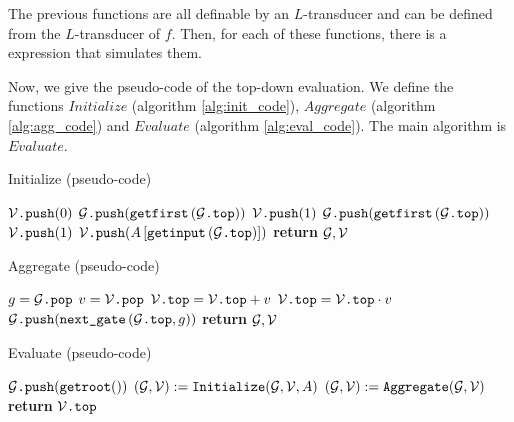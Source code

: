 The previous functions are all definable by an $L$-transducer and can be defined from the $L$-transducer of $f$. Then, for each of these functions, there is a \langfor expression that simulates them.

Now, we give the pseudo-code of the top-down evaluation. We define the functions $Initialize$ (algorithm \ref{alg:init_code}), $Aggregate$ (algorithm \ref{alg:agg_code}) and $Evaluate$ (algorithm \ref{alg:eval_code}). The main algorithm is $Evaluate$.

\begin{algorithm}
\caption{Initialize (pseudo-code)}\label{alg:init_code}
\begin{algorithmic}[1]
	\If{$\isplus{\gettop{\cG}}$}
		\State $\mathcal{V}\texttt{.push}(0)$
		\State $\mathcal{G}\texttt{.push}(\texttt{getfirst}\left(\mathcal{G}\texttt{.top} \right))$
	\ElsIf{$\isprod{\gettop{\cG}}$}
		\State $\mathcal{V}\texttt{.push}(1)$
		\State $\mathcal{G}\texttt{.push}(\texttt{getfirst}\left(\mathcal{G}\texttt{.top} \right))$
	\ElsIf{$\isone{\gettop{\cG}}$}
		\State $\mathcal{V}\texttt{.push}(1)$
	\ElsIf{$\isinput{\gettop{\cG}}$}
		\State $\mathcal{V}\texttt{.push}(A\left[ \texttt{getinput}\left(\mathcal{G}\texttt{.top} \right) \right])$
	\EndIf
	\State \textbf{return} $\mathcal{G}, \mathcal{V}$
\EndFunction
\end{algorithmic}
\end{algorithm}

\begin{algorithm}
\caption{Aggregate (pseudo-code)}\label{alg:agg_code}
\begin{algorithmic}[1]
	\State $g = \mathcal{G}\texttt{.pop}$
	\State $v = \mathcal{V}\texttt{.pop}$
	\If{$\isplus{\gettop{\cG}}$}
		\State $\mathcal{V}\texttt{.top} = \mathcal{V}\texttt{.top} + v$
	\ElsIf{$\isprod{\gettop{\cG}}$}
		\State $\mathcal{V}\texttt{.top} = \mathcal{V}\texttt{.top} \cdot v$
	\EndIf
		\State $\mathcal{G}\texttt{.push}(\texttt{next{\_}gate}\left(\mathcal{G}\texttt{.top}, g \right))$
	\EndIf
	\State \textbf{return} $\mathcal{G}, \mathcal{V}$
\EndFunction
\end{algorithmic}
\end{algorithm}

\begin{algorithm}
\caption{Evaluate (pseudo-code)}\label{alg:eval_code}
\begin{algorithmic}[1]
	\State $\mathcal{G}\texttt{.push}(\texttt{getroot}())$
			\State $(\mathcal{G},\mathcal{V}) := \texttt{Initialize}(\mathcal{G},\mathcal{V},A)$
		\Else
			\State $(\mathcal{G},\mathcal{V}):= \texttt{Aggregate}(\mathcal{G},\mathcal{V})$
		\EndIf
	\EndWhile
	\State \textbf{return} $\mathcal{V}\texttt{.top}$
\EndFunction
\end{algorithmic}
\end{algorithm}

